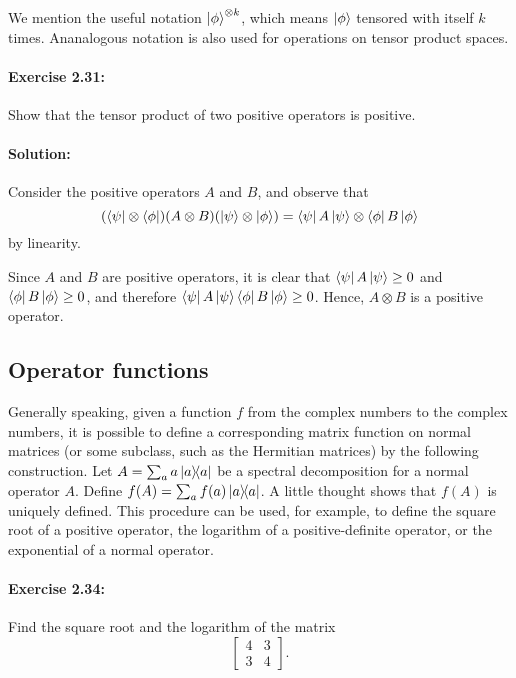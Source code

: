 \documentclass{article}
\begin{document}
We mention the useful notation $\ket{\phi}^{\otimes k}$, which means
$\ket{\phi}$ tensored with itself $k$ times. Ananalogous notation is also used
for operations on tensor product spaces.

\paragraph{\cite{mikeandike} Exercise 2.31:} Show that the tensor product of
two positive operators is positive.

\paragraph{Solution:} Consider the positive operators $A$ and $B$, and observe
that \begin{equation*}
  (\bra{\psi} \otimes \bra{\phi})(A \otimes B)(\ket{\psi} \otimes \ket{\phi})
    = \bra{\psi}A\ket{\psi} \otimes \bra{\phi}B\ket{\phi}
\end{equation*} by linearity.

Since $A$ and $B$ are positive operators, it is clear that $\bra{\psi}A
\ket{\psi} \geq 0$ and $\bra{\phi}B\ket{\phi} \geq 0$, and therefore
$\bra{\psi}A\ket{\psi} \bra{\phi}B\ket{\phi} \geq 0$. Hence, $A \otimes B$ is a
positive operator.

\subsection{Operator functions}

Generally speaking, given a function $f$ from the complex numbers to the
complex numbers, it is possible to define a corresponding matrix function on
normal matrices (or some subclass, such as the Hermitian matrices) by the
following construction. Let $A = \sum_a a\ketbra{a}{a}$ be a spectral
decomposition for a normal operator $A$. Define $f(A) = \sum_a f(a)
\ketbra{a}{a}$. A little thought shows that $f(A)$ is uniquely defined. This
procedure can be used, for example, to define the square root of a positive
operator, the logarithm of a positive-definite operator, or the exponential
of a normal operator.

\paragraph{\cite{mikeandike} Exercise 2.34:} Find the square root and the
logarithm of the matrix \begin{equation*}
  \begin{bmatrix}
    4 & 3 \\
    3 & 4
  \end{bmatrix}.
\end{equation*}
\end{document}
